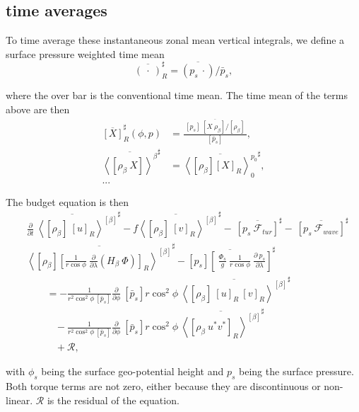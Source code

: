 \documentclass[11pt]{article}
\numberwithin{equation}{section}
\newcommand{\beq}{\begin{equation}}
\newcommand{\eeq}{\end{equation}}
\newcommand{\la}{\langle}
\newcommand{\ra}{\rangle}
\newcommand{\lara}[1]{\left\la{#1}\right\ra}
\newcommand{\cphi}{\cos \phi}
\newcommand{\rb}{\rho_\beta}
\newcommand{\barsharp}[1]{\overline{#1}^\sharp}
\begin{document}
\subsection{time averages}
To time average these instantaneous zonal mean vertical integrals, we define a surface pressure weighted time mean
\beq
\barsharp{(~\cdot~)}_R = \overline{(p_s ~ \cdot)} / \bar p_s, 
\eeq


where the over bar is the conventional time mean. The time mean of the terms above are then 
\begin{align}
\barsharp{[X]}_R(\phi, p) &=  \frac{ ~\overline{ [p_s]  ~ [X~ \rb ]/ [ \rb]}  ~ }{   [\bar p_s]  }, \nonumber  \\
\barsharp{  \lara{[\rb ~X]}^\beta  } &= \barsharp{ \lara{[\rb] [X]_R}_0^{p_0} },  \nonumber \\
\text{... } \nonumber
\end{align}

The budget equation is then 
\begin{align} \label{eq:balance_rb_tm}
&\barsharp{  \frac{\partial} {\partial t} ~\lara{[\rb]~[u]_R}^{[\beta]}   }  - \barsharp{ f \lara{ [\rb]~[v]_R} ^{[\beta]}}  -  ~ \barsharp{ [p_s ~ \mathcal{F}_{tur}] }  -  ~ \barsharp{ [p_s ~ \mathcal{F}_{wave}] }   \nonumber \\
&\barsharp{ \lara{  [\rb]   \left[ \frac{1}{r \cphi} ~ \frac{\partial}{\partial \lambda} \left( H_\beta  ~\Phi  \right)   \right]_R}^{[\beta]} } - \barsharp{[p_s]  \left[~\frac{\Phi_s}{g}~ \frac{1}{r \cphi} ~\frac{\partial~p_s}{\partial \lambda}\right]}  \nonumber\\ 
  &~~~~~~~~~= - \frac{1}{r^2 \cos^2{\phi} ~ [\bar p_s] }  \frac{\partial}{\partial \phi}  ~[\bar p_s]  r \cos^2{\phi} ~ \barsharp{ \lara{ [\rb]~[u]_R~[v]_R }^{[\beta]} }  \nonumber \\
  &~~~~~~~~~~~~~- \frac{1}{r^2 \cos^2{\phi} ~ [\bar p_s] }  \frac{\partial}{\partial \phi}  ~[\bar p_s]  r \cos^2{\phi} ~ \barsharp{ \lara{[\rb~ u^* v^{*}]_R   }^{[\beta]}  }  \nonumber\\
  &~~~~~~~~~~~~~+ \mathcal{R},
\end{align}

with $\phi_s$ being the surface geo-potential height and $p_s$ being the surface pressure. Both torque terms are not zero, either because they are discontinuous or non-linear. $\mathcal{R}$ is the residual of the equation.\par
\end{document}
